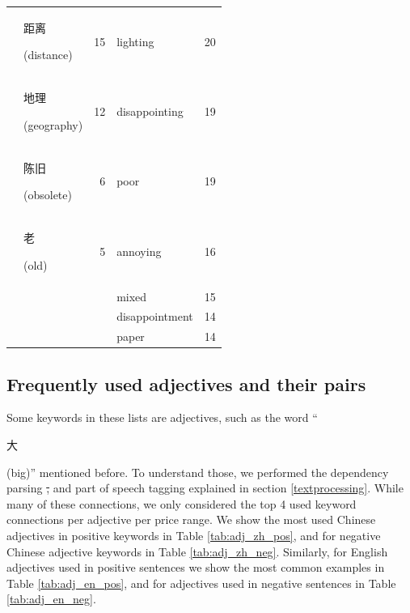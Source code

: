 \documentclass[smallextended,natbib]{svjour3}       %
\providecommand{\DIFdel}[1]{{\protect\color{red}\sout{#1}}}                      %
\providecommand{\DIFdelbegin}{} %
\providecommand{\DIFdelend}{} %
\newcommand{\DIFscaledelfig}{0.5}
\newlength{\DIFdelgraphicswidth} %
\newlength{\DIFdelgraphicsheight} %
\newcommand{\DIFdelincludegraphics}[2][]{%
\sbox{\DIFdelgraphicsbox}{\DIFOincludegraphics[#1]{#2}}%
\settoboxwidth{\DIFdelgraphicswidth}{\DIFdelgraphicsbox} %
\settoboxtotalheight{\DIFdelgraphicsheight}{\DIFdelgraphicsbox} %
\scalebox{\DIFscaledelfig}{%
\parbox[b]{\DIFdelgraphicswidth}{\usebox{\DIFdelgraphicsbox}\\[-\baselineskip] \rule{\DIFdelgraphicswidth}{0em}}\llap{\resizebox{\DIFdelgraphicswidth}{\DIFdelgraphicsheight}{%
\setlength{\unitlength}{\DIFdelgraphicswidth}%
\begin{picture}(1,1)%
\thicklines\linethickness{2pt} %
{\color[rgb]{1,0,0}\put(0,0){\framebox(1,1){}}}%
{\color[rgb]{1,0,0}\put(0,0){\line( 1,1){1}}}%
{\color[rgb]{1,0,0}\put(0,1){\line(1,-1){1}}}%
\end{picture}%
}\hspace*{3pt}}} %
} %
\DeclareRobustCommand{\DIFdelbegin}{\DIFOdelbegin \let\includegraphics\DIFdelincludegraphics} %
\DeclareRobustCommand{\DIFdelend}{\DIFOaddend \let\includegraphics\DIFOincludegraphics} %
\begin{document}
\begin{table}[ht]
{\begin{tabular}{|c|lr|lr|}
                                                             & \begin{CJK}{UTF8}{gbsn}距离\end{CJK} (distance)  & 15   & lighting       & 20  \\  
                                                             & \begin{CJK}{UTF8}{gbsn}地理\end{CJK} (geography) & 12   & disappointing  & 19  \\  
                                                             & \begin{CJK}{UTF8}{gbsn}陈旧\end{CJK} (obsolete)  & 6    & poor           & 19  \\  
                                                             & \begin{CJK}{UTF8}{gbsn}老\end{CJK} (old)        & 5    & annoying       & 16  \\  
                                                             &                                                &      & mixed          & 15  \\  
                                                             &                                                &      & disappointment & 14  \\  
                                                             &                                                &      & paper          & 14  \\ \hline
        \end{tabular}%
        }
    \end{table}

  \subsection{Frequently used adjectives and their pairs}\label{adjresults}

    Some keywords in these lists are adjectives, such as the word ``\begin{CJK}{UTF8}{gbsn}大\end{CJK} (big)'' mentioned before. To understand those, we performed the dependency parsing \DIFdelbegin \DIFdel{, }\DIFdelend and part of speech tagging explained in section \ref{textprocessing}. While many of these connections, we only considered the top 4 used keyword connections per adjective per price range. We show the most used Chinese adjectives in positive keywords in Table \ref{tab:adj_zh_pos}, and for negative Chinese adjective keywords in Table \ref{tab:adj_zh_neg}. Similarly, for English adjectives used in positive sentences we show the most common examples in Table \ref{tab:adj_en_pos}, and for adjectives used in negative sentences in Table \ref{tab:adj_en_neg}.
\end{document}
